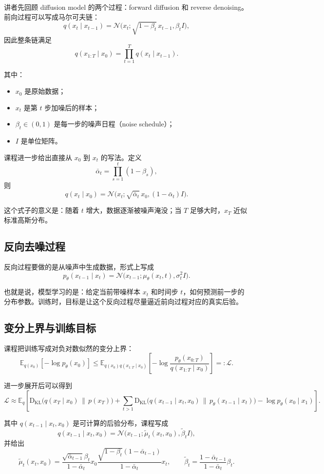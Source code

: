 \documentclass[a4paper]{article}
\begin{document}
讲者先回顾 diffusion model 的两个过程：forward diffusion 和 reverse denoising。前向过程可以写成马尔可夫链：
\[
q(x_t\mid x_{t-1})=\mathcal{N}\!\bigl(x_t;\sqrt{1-\beta_t}\,x_{t-1},\beta_t I\bigr),
\]
因此整条链满足
\[
q(x_{1:T}\mid x_0)=\prod_{t=1}^{T} q(x_t\mid x_{t-1}).
\]

其中：
\begin{itemize}
  \item \(x_0\) 是原始数据；
  \item \(x_t\) 是第 \(t\) 步加噪后的样本；
  \item \(\beta_t\in(0,1)\) 是每一步的噪声日程（noise schedule）；
  \item \(I\) 是单位矩阵。
\end{itemize}

课程进一步给出直接从 \(x_0\) 到 \(x_t\) 的写法。定义
\[
\bar\alpha_t=\prod_{s=1}^{t}(1-\beta_s),
\]
则
\[
q(x_t\mid x_0)=\mathcal{N}\!\bigl(x_t;\sqrt{\bar\alpha_t}\,x_0,(1-\bar\alpha_t)I\bigr).
\]

这个式子的意义是：随着 \(t\) 增大，数据逐渐被噪声淹没；当 \(T\) 足够大时，\(x_T\) 近似标准高斯分布。

\subsection{反向去噪过程}

反向过程要做的是从噪声中生成数据，形式上写成
\[
p_\theta(x_{t-1}\mid x_t)=\mathcal{N}\!\bigl(x_{t-1};\mu_\theta(x_t,t),\sigma_t^2 I\bigr).
\]

也就是说，模型学习的是：给定当前带噪样本 \(x_t\) 和时间步 \(t\)，如何预测前一步的分布参数。训练时，目标是让这个反向过程尽量逼近前向过程对应的真实后验。

\subsection{变分上界与训练目标}

课程把训练写成对负对数似然的变分上界：
\[
\mathbb{E}_{q(x_0)}[-\log p_\theta(x_0)]
\leq
\mathbb{E}_{q(x_0)q(x_{1:T}\mid x_0)}
\left[-\log \frac{p_\theta(x_{0:T})}{q(x_{1:T}\mid x_0)}\right]
 =: \mathcal{L}.
\]

进一步展开后可以得到
\[
\mathcal{L}
\approx
\mathbb{E}_q\!\left[
\mathrm{D}_{\mathrm{KL}}\!\bigl(q(x_T\mid x_0)\,\|\,p(x_T)\bigr)
+\sum_{t>1}\mathrm{D}_{\mathrm{KL}}\!\bigl(q(x_{t-1}\mid x_t,x_0)\,\|\,p_\theta(x_{t-1}\mid x_t)\bigr)
-\log p_\theta(x_0\mid x_1)
\right].
\]

其中 \(q(x_{t-1}\mid x_t,x_0)\) 是可计算的后验分布，课程写成
\[
q(x_{t-1}\mid x_t,x_0)=\mathcal{N}\!\bigl(x_{t-1};\tilde\mu_t(x_t,x_0),\tilde\beta_t I\bigr),
\]
并给出
\[
\tilde\mu_t(x_t,x_0)=
\frac{\sqrt{\bar\alpha_{t-1}}\beta_t}{1-\bar\alpha_t}x_0
\frac{\sqrt{1-\beta_t}(1-\bar\alpha_{t-1})}{1-\bar\alpha_t}x_t,
\qquad
\tilde\beta_t=\frac{1-\bar\alpha_{t-1}}{1-\bar\alpha_t}\beta_t.
\]
\end{document}
